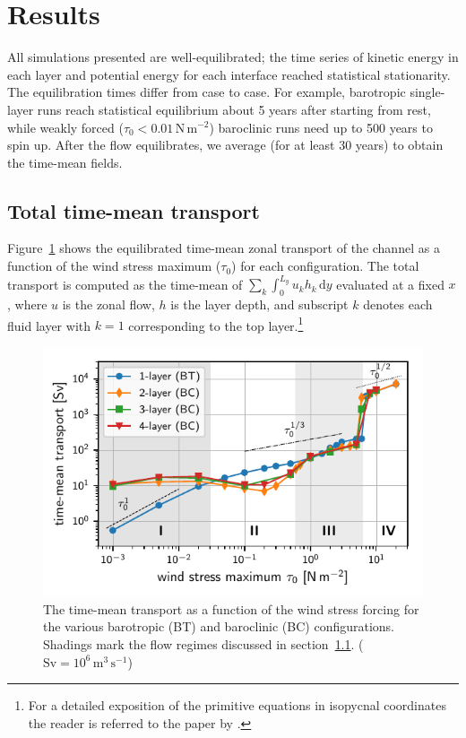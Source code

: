 \documentclass{agujournal2019}
\newcommand{\Pa}		{\mathrm{N}\,\mathrm{m}^{-2}}
\begin{document}
\section{Results}

All simulations presented are well-equilibrated; {\color{black}the time series of kinetic energy in each layer and potential energy for each interface reached statistical stationarity}. The equilibration times differ from case to case. For example, barotropic single-layer runs reach statistical equilibrium about 5 years after starting from rest, while weakly forced ($\tau_0<0.01\,\Pa$) baroclinic runs need up to 500 years to spin up. After the flow equilibrates, we average (for at least 30 years) to obtain the time-mean fields.


\subsection{Total time-mean transport}\label{sec:transport}

Figure~\ref{fig:transport} shows the equilibrated time-mean zonal transport of the channel as a function of the wind stress maximum ($\tau_0$) for each configuration. The total transport is computed as the time-mean of $\sum_k\int_0^{L_y} u_k h_k\,\mathrm{d}y$ evaluated at a fixed $x$, where $u$ is the zonal flow, $h$ is the layer depth, and subscript $k$ denotes each fluid layer with $k=1$ corresponding to the top layer.\footnote{For a detailed exposition of the primitive equations in isopycnal coordinates the reader is referred to the paper by .}

\begin{figure}
\centering
\noindent\includegraphics{transport}
\vspace*{-1em}\caption{The time-mean transport as a function of the wind stress forcing for the various barotropic (BT) and baroclinic (BC) configurations. Shadings mark the flow regimes discussed in section~\ref{sec:transport}.  ($\text{Sv} = 10^6\,\text{m}^3\,\text{s}^{-1}$)}\label{fig:transport}\vspace*{-3em}
\end{figure}
\end{document}
